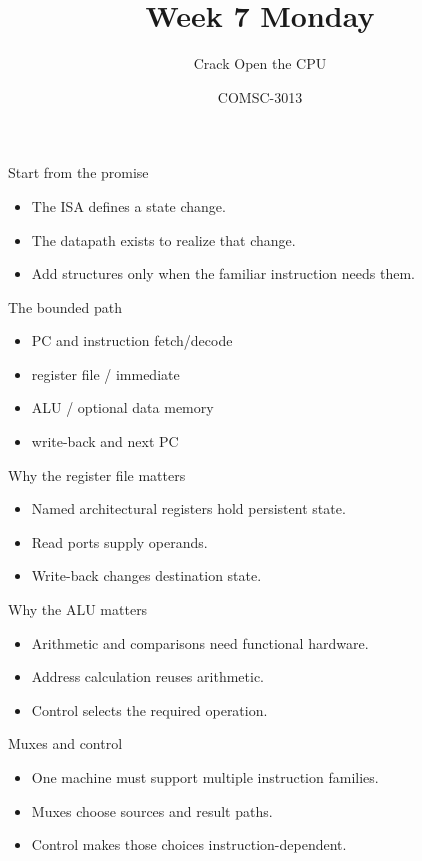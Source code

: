 \documentclass{beamer}
\title{Week 7 Monday}\subtitle{Crack Open the CPU}\author{COMSC-3013}\date{}
\begin{document}
\begin{frame}\titlepage{}\end{frame}
\begin{frame}{Start from the promise}\begin{itemize}\item The ISA defines a state change.\item The datapath exists to realize that change.\item Add structures only when the familiar instruction needs them.\end{itemize}\end{frame}
\begin{frame}{The bounded path}\begin{itemize}\item PC and instruction fetch/decode\item register file / immediate\item ALU / optional data memory\item write-back and next PC\end{itemize}\end{frame}
\begin{frame}{Why the register file matters}\begin{itemize}\item Named architectural registers hold persistent state.\item Read ports supply operands.\item Write-back changes destination state.\end{itemize}\end{frame}
\begin{frame}{Why the ALU matters}\begin{itemize}\item Arithmetic and comparisons need functional hardware.\item Address calculation reuses arithmetic.\item Control selects the required operation.\end{itemize}\end{frame}
\begin{frame}{Muxes and control}\begin{itemize}\item One machine must support multiple instruction families.\item Muxes choose sources and result paths.\item Control makes those choices instruction-dependent.\end{itemize}\end{frame}
\end{document}
